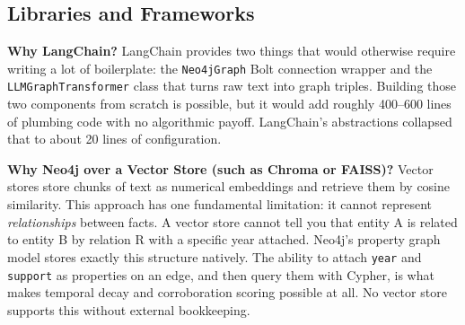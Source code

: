 \subsection{Libraries and Frameworks}

\begin{table}[H]
\centering
\caption{Software stack and version details}
\label{tab:deps}
\end{table}

\textbf{Why LangChain?}
LangChain provides two things that would otherwise require writing a lot of
boilerplate: the \texttt{Neo4jGraph} Bolt connection wrapper and the
\texttt{LLMGraphTransformer} class that turns raw text into graph triples.
Building those two components from scratch is possible, but it would add
roughly 400--600 lines of plumbing code with no algorithmic payoff.
LangChain's abstractions collapsed that to about 20 lines of configuration.

\textbf{Why Neo4j over a Vector Store (such as Chroma or FAISS)?}
Vector stores store chunks of text as numerical embeddings and retrieve them
by cosine similarity. This approach has one fundamental limitation: it cannot
represent \emph{relationships} between facts. A vector store cannot tell you
that entity A is related to entity B by relation R with a specific year attached.
Neo4j's property graph model stores exactly this structure natively. The ability
to attach \texttt{year} and \texttt{support} as properties on an edge, and then
query them with Cypher, is what makes temporal decay and corroboration scoring
possible at all. No vector store supports this without external bookkeeping.

